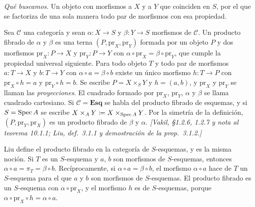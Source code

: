 \emph{Qué buscamos.} Un objeto con morfismos a \(X\) y a \(Y\) que coinciden en \(S\), por el que se factoriza de una sola manera todo par de morfismos con esa propiedad.

\begin{defi}
\label{defi:s11-producto-fibrado}
Sea \(\mathcal C\) una categoría y sean \(\alpha\colon X\to S\) y \(\beta\colon Y\to S\) morfismos de \(\mathcal C\). Un producto fibrado de \(\alpha\) y \(\beta\) es una terna \((P,\mathrm{pr}_X,\mathrm{pr}_Y)\) formada por un objeto \(P\) y dos morfismos \(\mathrm{pr}_X\colon P\to X\) y \(\mathrm{pr}_Y\colon P\to Y\) con \(\alpha\circ\mathrm{pr}_X=\beta\circ\mathrm{pr}_Y\), que cumple la propiedad universal siguiente. Para todo objeto \(T\) y todo par de morfismos \(a\colon T\to X\) y \(b\colon T\to Y\) con \(\alpha\circ a=\beta\circ b\) existe un único morfismo \(h\colon T\to P\) con \(\mathrm{pr}_X\circ h=a\) y \(\mathrm{pr}_Y\circ h=b\). Se escribe \(P=X\times_S Y\) y \(h=(a,b)\), y \(\mathrm{pr}_X\) y \(\mathrm{pr}_Y\) se llaman las \emph{proyecciones}. El cuadrado formado por \(\mathrm{pr}_X\), \(\mathrm{pr}_Y\), \(\alpha\) y \(\beta\) se llama cuadrado cartesiano. Si \(\mathcal C=\mathbf{Esq}\) se habla del producto fibrado de esquemas, y si \(S=\operatorname{Spec} A\) se escribe \(X\times_A Y\coloneqq X\times_{\operatorname{Spec} A}Y\). Por la simetría de la definición, \((P,\mathrm{pr}_Y,\mathrm{pr}_X)\) es un producto fibrado de \(\beta\) y \(\alpha\). \emph{[Vakil, \S1.2.6, 1.2.7 y nota al teorema 10.1.1; Liu, def.~3.1.1 y demostración de la prop.~3.1.2.]}
\end{defi}

\begin{center}
\end{center}

\begin{obs}
\label{obs:s11-productos-s-esquemas}
Liu define el producto fibrado en la categoría de \(S\)-esquemas, y es la misma noción. Si \(T\) es un \(S\)-esquema y \(a\), \(b\) son morfismos de \(S\)-esquemas, entonces \(\alpha\circ a=\pi_T=\beta\circ b\). Recíprocamente, si \(\alpha\circ a=\beta\circ b\), el morfismo \(\alpha\circ a\) hace de \(T\) un \(S\)-esquema para el que \(a\) y \(b\) son morfismos de \(S\)-esquemas. El producto fibrado es un \(S\)-esquema con \(\alpha\circ\mathrm{pr}_X\), y el morfismo \(h\) es de \(S\)-esquemas, porque \(\alpha\circ\mathrm{pr}_X\circ h=\alpha\circ a\).
\end{obs}

